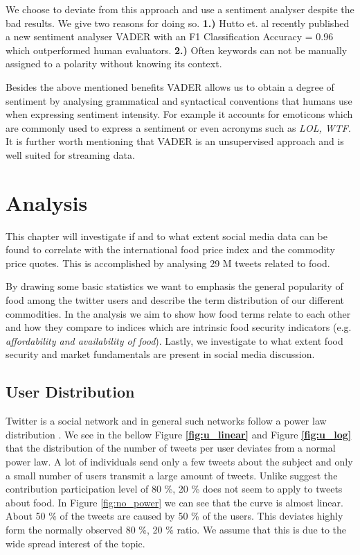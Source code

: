 We choose to deviate from this approach and use a sentiment analyser despite the bad results. We give two reasons for doing so. \textbf{1.)} Hutto et. al recently published a new sentiment analyser VADER \cite{hutton14} with an F1 Classification Accuracy = 0.96 which  outperformed human evaluators. \textbf{2.)} Often keywords can not be manually assigned to a polarity without knowing its context. 

Besides the above mentioned benefits VADER allows us to obtain a degree of sentiment by analysing grammatical and syntactical conventions that humans use when expressing sentiment intensity. For example it accounts for emoticons which are commonly used to express a sentiment or even acronyms such as \emph{LOL, WTF}. It is further worth mentioning that VADER is an unsupervised approach and is well suited for streaming data. 






\chapter{Analysis}

This chapter will investigate if and to what extent social media data can be found to correlate with the international food price index and the commodity price quotes. This is accomplished by analysing 29 M tweets related to food. 

By drawing some basic statistics we want to emphasis the general popularity of food among the twitter users and describe the term distribution of our different commodities. In the analysis we aim to show how food terms relate to each other and how they compare to indices which are intrinsic food security indicators (e.g. \emph {affordability and availability of food}). Lastly, we investigate to what extent food security and market fundamentals are present in social media discussion. 


\section {User Distribution}

Twitter is a social network and in general such networks follow a power law distribution \cite{Whittaker:1998}. We see in the bellow Figure \textbf{\ref{fig:u_linear}} and Figure \textbf{\ref{fig:u_log}}  that the distribution of the number of tweets per user deviates from a normal power law. A lot of individuals  send only a few tweets about the subject and only a small number of users transmit a large amount of tweets. Unlike \cite{bild15} suggest the contribution participation level of  80 \%, 20 \%   does not seem to apply to tweets about food. In Figure \ref{fig:no_power} we can see that the curve is almost linear. About 50 \% of the tweets are caused by 50 \% of the users. This deviates highly form the normally observed 80 \%, 20 \% ratio. We assume that this is due to the wide spread interest of the topic.




